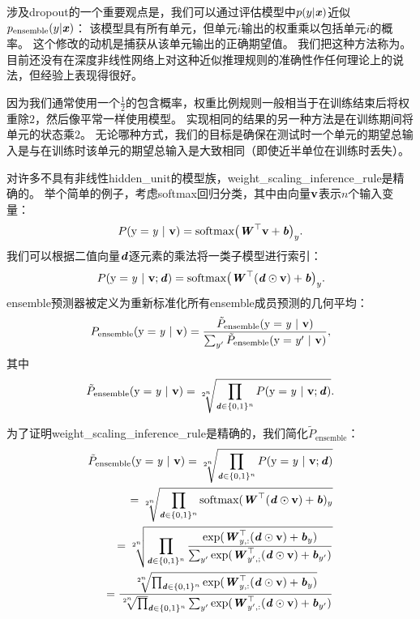 涉及\gls{dropout}的一个重要观点\citep{Hinton-et-al-arxiv2012}是，我们可以通过评估模型中$p(y | \boldsymbol{\mathit{x}})$近似$ p_{\text{ensemble}}(y | \boldsymbol{\mathit{x}}) $：
该模型具有所有单元，但单元$i$输出的权重乘以包括单元$i$的概率。
这个修改的动机是捕获从该单元输出的正确期望值。
我们把这种方法称为。
目前还没有在深度非线性网络上对这种近似推理规则的准确性作任何理论上的说法，但经验上表现得很好。

 
因为我们通常使用一个$\frac{1}{2}$的包含概率，权重比例规则一般相当于在训练结束后将权重除$2$，然后像平常一样使用模型。
实现相同的结果的另一种方法是在训练期间将单元的状态乘$2$。
无论哪种方式，我们的目标是确保在测试时一个单元的期望总输入是与在训练时该单元的期望总输入是大致相同（即使近半单位在训练时丢失）。

对许多不具有非线性\gls{hidden_unit}的模型族，\gls{weight_scaling_inference_rule}是精确的。
举个简单的例子，考虑\gls{softmax}回归分类，其中由向量$\mathbf{v}$表示$n$个输入变量：
\begin{align}
 P(\mathrm{y} = \mathit{y} ~|~ \mathbf{v}) = \text{softmax}\big(\boldsymbol{\mathit{W}}^\top\mathbf{v} + \boldsymbol{\mathit{b}}\big)_y.
\end{align}
我们可以根据二值向量$\boldsymbol{\mathit{d}}$逐元素的乘法将一类子模型进行索引：
\begin{align}
P(\mathrm{y} = \mathit{y} ~|~ \mathbf{v}; \boldsymbol{\mathit{d}}) = \text{softmax}\big(\boldsymbol{\mathit{W}}^\top(\boldsymbol{\mathit{d}} \odot \mathbf{v}) + \boldsymbol{\mathit{b}} \big)_y.
\end{align}
\gls{ensemble}预测器被定义为重新标准化所有\gls{ensemble}成员预测的几何平均：
\begin{align} \label{eq:758pe}
P_{\text{ensemble}}(\mathrm{y} = \mathit{y} ~|~ \mathbf{v})  = \frac{\tilde{P}_{\text{ensemble}}(\mathrm{y} = \mathit{y} ~|~ \mathbf{v})}
 {\sum_{y'}\tilde{P}_{\text{ensemble}}(\mathrm{y} = \mathit{y}' ~|~ \mathbf{v}) },
\end{align}
其中
\begin{align}
\tilde{P}_{\text{ensemble}}(\mathrm{y}=\mathit{y} ~|~ \mathbf{v}) =
\sqrt[2^n]{\prod_{\boldsymbol{\mathit{d}} \in \{0,1\}^n} P(\mathrm{y} = \mathit{y} ~|~ \mathbf{v}; \boldsymbol{\mathit{d}})}.
\end{align}

为了证明\gls{weight_scaling_inference_rule}是精确的，我们简化$ \tilde{P}_{\text{ensemble}}$：
\begin{align}
\tilde{P}_{\text{ensemble}}(\mathrm{y}=\mathit{y} ~|~ \mathbf{v}) =
\sqrt[2^n]{\prod_{\boldsymbol{\mathit{d}} \in \{0,1\}^n} P(\mathrm{y} = \mathit{y} ~|~ \mathbf{v}; \boldsymbol{\mathit{d}})} \\
= \sqrt[2^n]{\prod_{\boldsymbol{\mathit{d}} \in \{0,1\}^n} \text{softmax}(\boldsymbol{\mathit{W}}^\top(\boldsymbol{\mathit{d}} \odot \mathbf{v}) + \boldsymbol{\mathit{b}})_y} \\
= \sqrt[2^n]{\prod_{\boldsymbol{\mathit{d}} \in \{0,1\}^n} \frac{\exp (\boldsymbol{\mathit{W}}_{y,:}^\top(\boldsymbol{\mathit{d}} \odot \mathbf{v}) + \boldsymbol{\mathit{b}}_y)}
{\sum_{y'}\exp (\boldsymbol{\mathit{W}}_{y',;}^\top(\boldsymbol{\mathit{d}} \odot \mathbf{v}) + \boldsymbol{\mathit{b}}_{y'})}}\\
=  \frac{\sqrt[2^n]{\prod_{\boldsymbol{\mathit{d}} \in \{0,1\}^n}\exp (\boldsymbol{\mathit{W}}_{y,:}^\top(\boldsymbol{\mathit{d}} \odot \mathbf{v}) + \boldsymbol{\mathit{b}}_y)}}
{ \sqrt[2^n] \prod_{\boldsymbol{\mathit{d}} \in \{0,1\}^n} \sum_{y'}\exp (\boldsymbol{\mathit{W}}_{y',:}^\top(\boldsymbol{\mathit{d}} \odot \mathbf{v}) + \boldsymbol{\mathit{b}}_{y'})}
\end{align}

